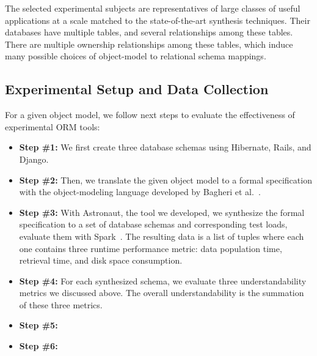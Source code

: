 \documentclass[10pt,conference]{IEEEtran}
\begin{document}
The selected experimental subjects are representatives of large classes of useful applications at a scale matched to the state-of-the-art synthesis techniques. Their databases have multiple tables, and several relationships among these tables. There are multiple ownership relationships among these tables, which induce many possible choices of object-model to relational schema mappings.


\subsection{Experimental Setup and Data Collection}

For a given object model, we follow next steps to evaluate the effectiveness of experimental ORM tools:

\begin{itemize}
\item \textbf{Step \#1:} We first create three database schemas using Hibernate, Rails, and Django.
\item \textbf{Step \#2:} Then, we translate the given object model to a formal specification with the object-modeling language developed by Bagheri et al.~\cite{trademaker}.
\item \textbf{Step \#3:} With Astronaut, the tool we developed, we synthesize the formal specification to a set of database schemas and corresponding test loads, evaluate them with Spark~\cite{spark_paper}.  The resulting data is a list of tuples where each one contains three runtime performance metric: data population time, retrieval time, and disk space consumption.
\item \textbf{Step \#4:} For each synthesized schema, we evaluate three understandability metrics we discussed above. The overall understandability is the summation of these three metrics.
\item \textbf{Step \#5:} 
\item \textbf{Step \#6:}
\end{itemize}
\end{document}
